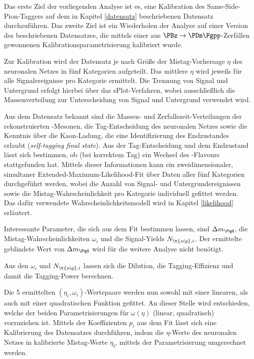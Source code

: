 Das erste Ziel der vorliegenden Analyse ist es, eine Kalibration des Same-Side-Pion-Taggers auf dem in Kapitel \ref{datensatz} beschriebenen Datensatz durchzuführen.
Das zweite Ziel ist ein Wiederholen der Analyse auf einer Version des beschriebenen Datensatzes, die mittels einer aus $\PBz \to \PDm\Pgpp$-Zerfällen gewonnenen Kalibrationsparametrisierung kalibriert wurde.

Zur Kalibration wird der Datensatz je nach Größe der Mistag-Vorhersage $η$ des neuronalen Netzes in fünf Kategorien aufgeteilt.
Das mittlere $η$ wird jeweils für alle Signalereignisse pro Kategorie ermittelt.
Die Trennung von Signal und Untergrund erfolgt hierbei über das sPlot-Verfahren\cite{splot}, wobei ausschließlich die Massenverteilung zur Unterscheidung von Signal und Untergrund verwendet wird.

Aus dem Datensatz bekannt sind die Massen- und Zerfallszeit-Verteilungen der rekonstruierten \PB-Mesonen, die Tag-Entscheidung des neuronalen Netzes sowie die Kenntnis über die Kaon-Ladung, die eine Identifizierung des Endzustandes erlaubt (\emph{self-tagging final state}).
Aus der Tag-Entscheidung und dem Endzustand lässt sich bestimmen, ob (bei korrektem Tag) ein Wechsel des \Pqb-Flavours stattgefunden hat.
Mittels dieser Informationen kann ein zweidimensionaler, simultaner Extended-Maximum-Likelihood-Fit über Daten aller fünf Kategorien durchgeführt werden, wobei die Anzahl von Signal- und Untergrundereignissen sowie die Mistag-Wahrscheinlichkeit pro Kategorie individuell gefittet werden.
Das dafür verwendete Wahrscheinlichkeitsmodell wird in Kapitel \ref{likelihood} erläutert.

Interessante Parameter, die sich aus dem Fit bestimmen lassen, sind $\difference{m_{\Pqd}}$, die Mistag-Wahrscheinlichkeiten $ω_i$ und die Signal-Yields $N_{\t{sig},i}$.
Der ermittelte geblindete Wert von $\difference{m_{\Pqd}}$ wird für die weitere Analyse nicht benötigt.

Aus den $ω_i$ und $N_{\t{sig},i}$ lassen sich die Dilution, die Tagging-Effizienz und damit die Tagging-Power berechnen.

Die 5 ermittelten $(η_i, ω_i)$-Wertepaare werden nun sowohl mit einer linearen, als auch mit einer quadratischen Funktion gefittet.
An dieser Stelle wird entschieden, welche der beiden Parametrisierungen für $ω(η)$ (linear, quadratisch) vorzuziehen ist.
Mittels der Koeffizienten $p_i$ aus dem Fit lässt sich eine Kalibrierung des Datensatzes durchführen, indem die $η$-Werte des neuronalen Netzes in kalibrierte Mistag-Werte $η_C$ mittels der Parametrisierung umgerechnet werden.

